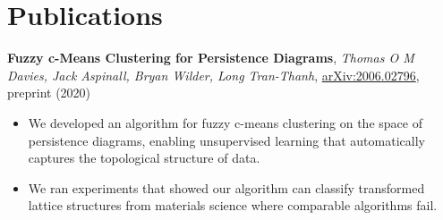 \documentclass[11pt,a4paper,sans]{moderncv}        %
\begin{document}
\section{Publications}
\vspace{4pt}
\textbf{Fuzzy c-Means Clustering for Persistence Diagrams}, \textit{Thomas O M Davies, Jack Aspinall, Bryan Wilder, Long Tran-Thanh}, \href{https://arxiv.org/abs/2006.02796}{arXiv:2006.02796}, preprint (2020)
\vspace{3pt}
{\small
\begin{itemize}
    \item We developed an algorithm for fuzzy c-means clustering on the space of persistence diagrams, enabling unsupervised learning that automatically captures the topological structure of data.
    \item We ran experiments that showed our algorithm can classify transformed lattice structures from materials science where comparable algorithms fail.
\end{itemize}}
\end{document}
